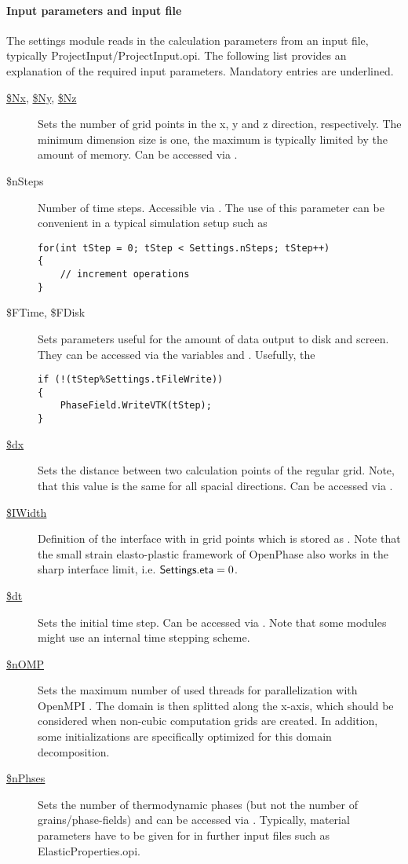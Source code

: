 \paragraph{Input parameters and input file} The settings module reads in the calculation parameters from an input file, typically ProjectInput/ProjectInput.opi. The following list provides an explanation of the required input parameters. Mandatory entries are underlined.
\begin{description}
 \item[\underline{\$Nx}, \underline{\$Ny}, \underline{\$Nz}] Sets the number of grid points in the x, y and z direction, respectively. The minimum dimension size is one, the maximum is typically limited by the amount of memory. Can be accessed via .
 \item[\$nSteps] Number of time steps. Accessible via . The use of this parameter can be convenient in a typical simulation setup such as 
\begin{lstlisting}[frame=single]
for(int tStep = 0; tStep < Settings.nSteps; tStep++)
{
	// increment operations
}
\end{lstlisting}
 \item[\$FTime, \$FDisk] Sets parameters useful for the amount of data output to disk and screen. They can be accessed via the variables  and . Usefully, the 
\begin{lstlisting}[frame=single]
if (!(tStep%Settings.tFileWrite))
{
    PhaseField.WriteVTK(tStep);
}
\end{lstlisting}

\item[\underline{\$dx}] Sets the distance between two calculation points of the regular grid. Note, that this value is the same for all spacial directions. Can be accessed via .
\item[\underline{\$IWidth}] Definition of the interface with in grid points which is stored as . Note that the small strain elasto-plastic framework of OpenPhase also works in the sharp interface limit, i.e. $\textsf{Settings.eta} = 0$.
\item[\underline{\$dt}] Sets the initial time step. Can be accessed via . Note that some modules might use an internal time stepping scheme.
\item[\underline{\$nOMP}] Sets the maximum number of used threads for parallelization with OpenMPI . The domain is then splitted along the x-axis, which should be considered when non-cubic computation grids are created. In addition, some initializations are specifically optimized for this domain decomposition.
\item[\underline{\$nPhses}] Sets the number of thermodynamic phases (but not the number of grains/phase-fields) and can be accessed via . Typically, material parameters have to be given for  in further input files such as ElasticProperties.opi.
\end{description}


